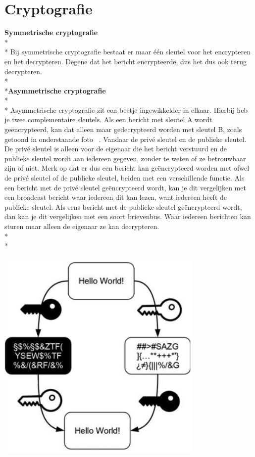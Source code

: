\documentclass[fleqn,a4paper,12pt]{book}
\begin{document}
\section{Cryptografie}
\textbf{Symmetrische cryptografie}\\*\\*
Bij symmetrische cryptografie bestaat er maar één sleutel voor het encrypteren en het decrypteren. Degene dat het bericht encrypteerde, dus het dus ook terug decrypteren. 
\\*\\*\textbf{Asymmetrische cryptografie}\\*\\*
Asymmetrische cryptografie zit een beetje ingewikkelder in elkaar. Hierbij heb je twee complementaire sleutels. Als een bericht met sleutel A wordt geëncrypteerd, kan dat alleen maar gedecrypteerd worden met sleutel B, zoals getoond in onderstaande foto ~\autocite{blockchain1}. Vandaar de privé sleutel en de publieke sleutel. De privé sleutel is alleen voor de eigenaar die het bericht verstuurd en de publieke sleutel wordt aan iedereen gegeven, zonder te weten of ze betrouwbaar zijn of niet. Merk op dat er dus een bericht kan geëncrypteerd worden met ofwel de privé sleutel of de publieke sleutel, beiden met een verschillende functie. Als een bericht met de privé sleutel geëncrypteerd wordt, kan je dit vergelijken met een broadcast bericht waar iedereen dit kan lezen, want iedereen heeft de publieke sleutel. Als eens bericht met de publieke sleutel geëncrypteerd wordt, dan kan je dit vergelijken met een soort brievenbus. Waar iedereen berichten kan sturen maar alleen de eigenaar ze kan decrypteren.\\*\\*
\begin{center}
	\includegraphics[width=10cm]{img/key}\\[1cm]
\end{center}
\end{document}
